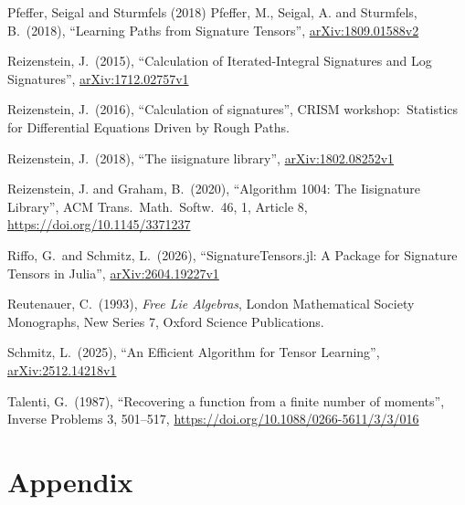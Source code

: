 \documentclass[12pt,english]{article}
\theoremstyle{remark}
\begin{document}
\begin{thebibliography}{Pfeffer, Seigal and Sturmfels (2018)}
Pfeffer, M.,
Seigal, A. and Sturmfels, B.\ (2018), ``Learning Paths from Signature
Tensors'', \href{https://arxiv.org/abs/1809.01588v2}{arXiv:1809.01588v2}

Reizenstein, J.\ (2015),
``Calculation of Iterated-Integral Signatures and Log Signatures'',
\href{https://arxiv.org/abs/1712.02757v1}{arXiv:1712.02757v1}

Reizenstein, J.\ (2016),
``Calculation of signatures'', CRISM workshop:\ Statistics for
Differential Equations Driven by Rough Paths.

Reizenstein, J.\ (2018),
``The iisignature library'',
\href{https://arxiv.org/abs/1802.08252v1}{arXiv:1802.08252v1}

Reizenstein, J.
and Graham, B.\ (2020), ``Algorithm 1004: The Iisignature Library'',
ACM Trans.\ Math.\ Softw.\ 46, 1, Article 8,
\href{https://doi.org/10.1145/3371237}{https://doi.org/10.1145/3371237}

Riffo, G.\ and
Schmitz, L.\ (2026), ``SignatureTensors.jl: A Package for Signature
Tensors in Julia'',
\href{https://arxiv.org/abs/2604.19227v1}{arXiv:2604.19227v1}

Reutenauer, C.\ (1993),
\emph{Free Lie Algebras}, London Mathematical Society Monographs,
New Series 7, Oxford Science Publications.

Schmitz, L.\ (2025), ``An
Efficient Algorithm for Tensor Learning'',
\href{https://arxiv.org/abs/2512.14218v1}{arXiv:2512.14218v1}

Talenti, G.\ (1987), ``Recovering
a function from a finite number of moments'', Inverse Problems 3,
501--517,
\href{https://doi.org/10.1088/0266-5611/3/3/016}{https://doi.org/10.1088/0266-5611/3/3/016}

\end{thebibliography}

\pagebreak{}

\appendix
\part*{Appendix}

\end{document}
